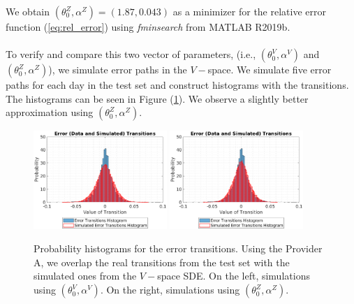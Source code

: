 \documentclass[11pt]{article}
\theoremstyle{definition}
\begin{document}
%


We obtain $(\theta_0^Z,\alpha^Z)=(1.87,0.043)$ as a minimizer for the relative error function (\ref{eq:rel_error}) using \textit{fminsearch} from MATLAB R2019b.\\
\quad\\
To verify and compare this two vector of parameters, (i.e., $(\theta_0^V,\alpha^V)$ and $(\theta_0^Z,\alpha^Z)$), we simulate error paths in the $V-$space. We simulate five error paths for each day in the test set and construct histograms with the transitions. The histograms can be seen in Figure (\ref{fig:hists}). We observe a slightly better approximation using $(\theta^Z_0,\alpha^Z)$.

\begin{figure}[ht!]
\centering
\includegraphics[width=0.45\textwidth]{../../MATLAB_Files/Results/histograms/classic_noDelta/Optimal.eps}
\includegraphics[width=0.45\textwidth]{../../MATLAB_Files/Results/histograms/classic_noDelta/Lamperti_Optimal.eps}
\caption{Probability histograms for the error transitions. Using the Provider A, we overlap the real transitions from the test set with the simulated ones from the $V-$space SDE. On the left, simulations using $(\theta_0^V,\alpha^V)$. On the right, simulations using $(\theta_0^Z,\alpha^Z)$.}
\label{fig:hists}
\end{figure}
\end{document}
